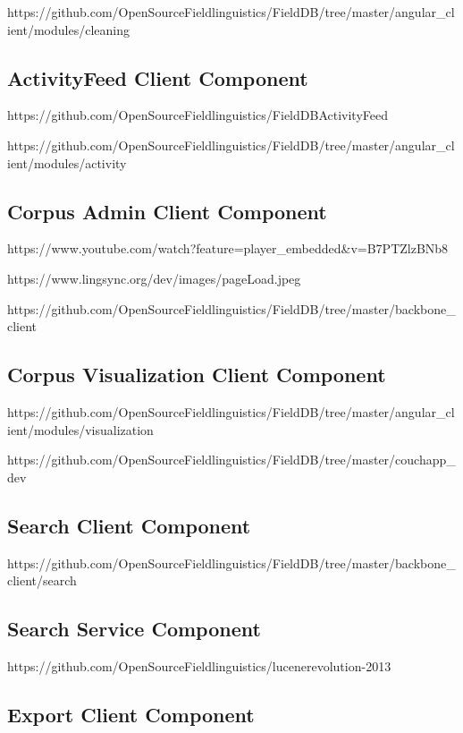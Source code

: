 \documentclass[12pt]{article}
\begin{document}
https://github.com/OpenSourceFieldlinguistics/FieldDB/tree/master/angular\_client/modules/cleaning

\subsection{ActivityFeed Client Component}

https://github.com/OpenSourceFieldlinguistics/FieldDBActivityFeed


https://github.com/OpenSourceFieldlinguistics/FieldDB/tree/master/angular\_client/modules/activity

\subsection{Corpus Admin Client Component}

https://www.youtube.com/watch?feature=player\_embedded\&v=B7PTZlzBNb8

https://www.lingsync.org/dev/images/pageLoad.jpeg

https://github.com/OpenSourceFieldlinguistics/FieldDB/tree/master/backbone\_client

\subsection{Corpus Visualization Client Component}

https://github.com/OpenSourceFieldlinguistics/FieldDB/tree/master/angular\_client/modules/visualization

https://github.com/OpenSourceFieldlinguistics/FieldDB/tree/master/couchapp\_dev

\subsection{Search Client Component}


https://github.com/OpenSourceFieldlinguistics/FieldDB/tree/master/backbone_client/search


\subsection{Search Service Component}

https://github.com/OpenSourceFieldlinguistics/lucenerevolution-2013


\subsection{Export Client Component}
\end{document}
